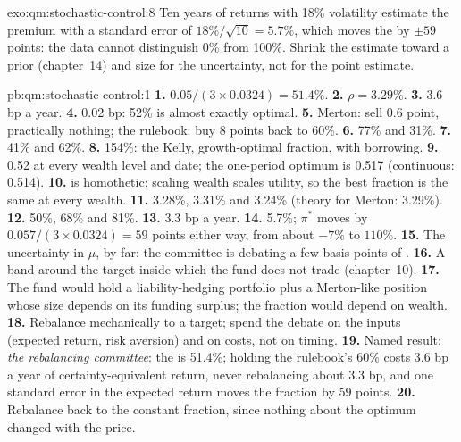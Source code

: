 \begin{solution}{exo:qm:stochastic-control:8}
Ten years of returns with 18\% volatility estimate the premium with a standard error of $18\%/\sqrt{10} = 5.7\%$, which
moves the  by $\pm 59$ points: the data cannot distinguish 0\% from 100\%. Shrink the estimate toward a
prior (chapter~14) and size for the uncertainty, not for the point estimate.
\end{solution}

\begin{solution}{pb:qm:stochastic-control:1}
\textbf{1.} $0.05/(3 \times 0.0324) = 51.4\%$.
\textbf{2.} $\rho = 3.29\%$.
\textbf{3.} 3.6 bp a year.
\textbf{4.} 0.02 bp: 52\% is almost exactly optimal.
\textbf{5.} Merton: sell 0.6 point, practically nothing; the rulebook: buy 8 points back to 60\%.
\textbf{6.} 77\% and 31\%.
\textbf{7.} 41\% and 62\%.
\textbf{8.} 154\%: the Kelly, growth-optimal fraction, with borrowing.
\textbf{9.} 0.52 at every wealth level and date; the one-period optimum is 0.517 (continuous: 0.514).
\textbf{10.}  is homothetic: scaling wealth scales utility, so the best fraction is the same at every
wealth.
\textbf{11.} 3.28\%, 3.31\% and 3.24\% (theory for Merton: 3.29\%).
\textbf{12.} 50\%, 68\% and 81\%.
\textbf{13.} 3.3 bp a year.
\textbf{14.} 5.7\%; $\pi^*$ moves by $0.057/(3 \times 0.0324) = 59$ points either way, from about $-7\%$ to $110\%$.
\textbf{15.} The uncertainty in $\mu$, by far: the committee is debating a few basis points of .
\textbf{16.} A band around the target inside which the fund does not trade (chapter~10).
\textbf{17.} The fund would hold a liability-hedging portfolio plus a Merton-like position whose size depends on its
funding surplus; the fraction would depend on wealth.
\textbf{18.} Rebalance mechanically to a target; spend the debate on the inputs (expected return, risk aversion) and
on costs, not on timing.
\textbf{19.} Named result: \emph{the rebalancing committee}: the  is 51.4\%; holding the rulebook's
60\% costs 3.6 bp a year of certainty-equivalent return, never rebalancing about 3.3 bp, and one standard error in
the expected return moves the fraction by 59 points.
\textbf{20.} Rebalance back to the constant fraction, since nothing about the optimum changed with the price.
\end{solution}

